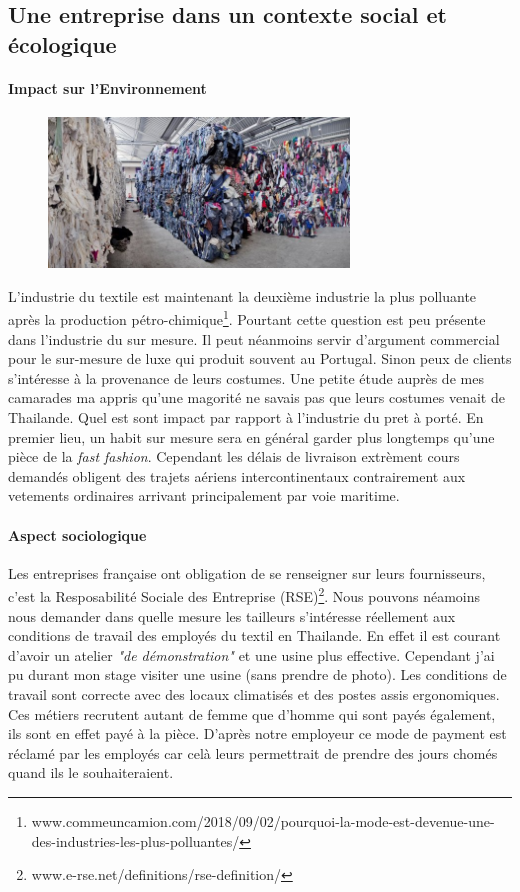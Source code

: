 \subsection[Contexte social et écologique]{Une entreprise dans un contexte social et \\écologique}
\paragraph{Impact sur l'Environnement}
\begin{figure}
\includegraphics[width=8cm]{image/recyclage.jpg}
\end{figure}
L'industrie du textile est maintenant la deuxième industrie la plus polluante après la production pétro-chimique\footnote{www.commeuncamion.com/2018/09/02/pourquoi-la-mode-est-devenue-une-des-industries-les-plus-polluantes/}. Pourtant cette question est peu présente dans l'industrie du sur mesure. Il peut néanmoins servir d'argument commercial pour le sur-mesure de luxe qui produit souvent au Portugal. Sinon peux de clients s'intéresse à la provenance de leurs costumes. Une petite étude auprès de mes camarades ma appris qu'une magorité ne savais pas que leurs costumes venait de Thailande. Quel est sont impact par rapport à l'industrie du pret à porté. En premier lieu, un habit sur mesure sera en général garder plus longtemps qu'une pièce de la \textit{fast fashion}. Cependant les délais de livraison extrèment cours demandés obligent des trajets aériens intercontinentaux contrairement aux vetements ordinaires arrivant principalement par voie maritime.
\paragraph{Aspect sociologique}
Les entreprises française ont obligation de se renseigner sur leurs fournisseurs, c'est la Resposabilité Sociale des Entreprise (RSE)\footnote{www.e-rse.net/definitions/rse-definition/}. Nous pouvons néamoins nous demander dans quelle mesure les tailleurs s'intéresse réellement aux conditions de travail des employés du textil en Thailande. En effet il est courant d'avoir un atelier \textit{"de démonstration"} et une usine plus effective. Cependant j'ai pu durant mon stage visiter une usine (sans prendre de photo). Les conditions de travail sont correcte avec des locaux climatisés et des postes assis ergonomiques. Ces métiers recrutent autant de femme que d'homme qui sont payés également, ils sont en effet payé à la pièce. D'après notre employeur ce mode de payment est réclamé par les employés car celà leurs permettrait de prendre des jours chomés quand ils le souhaiteraient.
